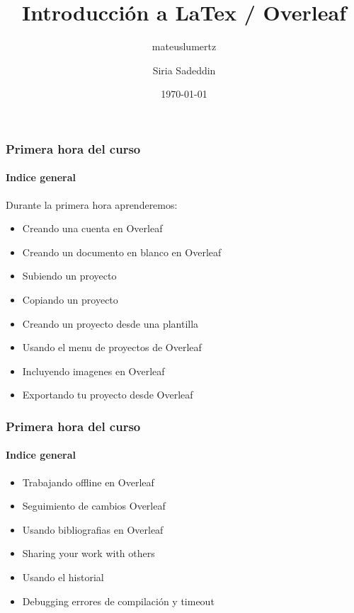 \documentclass[aspectratio=169]{beamer}
\author{mateuslumertz}
\title[Título Rodapé]{Introducción a LaTex / Overleaf
}
\author{Siria Sadeddin}
\date{\today}
\begin{document}
\begin{frame}[plain]
\maketitle
\end{frame}





\begin{frame}
\frametitle{Primera hora del curso}
\framesubtitle{Indice general}

Durante la primera hora aprenderemos:

\begin{itemize}

\item Creando una cuenta en Overleaf 

\item Creando un documento en blanco en Overleaf 

\item Subiendo un proyecto 

\item Copiando un proyecto 

\item Creando un proyecto desde una plantilla

\item Usando el menu de proyectos de Overleaf

\item Incluyendo imagenes en Overleaf

\item Exportando tu proyecto desde Overleaf


\end{itemize}

\end{frame}




\begin{frame}
\frametitle{Primera hora del curso}
\framesubtitle{Indice general}

\begin{itemize}
\item Trabajando offline en Overleaf

\item Seguimiento de cambios Overleaf 

\item Usando bibliografias en Overleaf 

\item Sharing your work with others 

\item Usando el historial 

\item Debugging errores de compilación y timeout

\end{itemize}

\end{frame}
\end{document}
